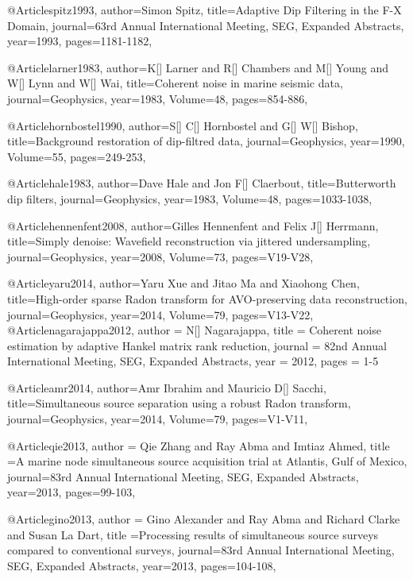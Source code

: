 {@Article{spitz1993,
  author={Simon Spitz},
  title={Adaptive Dip Filtering in the F-X Domain},
  journal={63rd Annual International Meeting, SEG, Expanded Abstracts},
  year=1993,
  pages={1181-1182},
}


@Article{larner1983,
  author={K[] Larner and R[] Chambers and M[] Young and W[] Lynn and W[] Wai},
  title={Coherent noise in marine seismic data},
  journal={Geophysics},
  year=1983,
  Volume=48,
  pages={854-886},
}

@Article{hornbostel1990,
  author={S[] C[] Hornbostel and G[] W[] Bishop},
  title={Background restoration of dip-filtred data},
  journal={Geophysics},
  year=1990,
  Volume=55,
  pages={249-253},
}

@Article{hale1983,
  author={Dave Hale and Jon F[] Claerbout},
  title={Butterworth dip filters},
  journal={Geophysics},
  year=1983,
  Volume=48,
  pages={1033-1038},
}

@Article{hennenfent2008,
  author={Gilles Hennenfent and Felix J[] Herrmann},
  title={Simply denoise: Wavefield reconstruction via jittered undersampling},
  journal={Geophysics},
  year=2008,
  Volume=73,
  pages={V19-V28},
}

@Article{yaru2014,
  author={Yaru Xue and Jitao Ma and Xiaohong Chen},
  title={High-order sparse Radon transform for AVO-preserving data reconstruction},
  journal={Geophysics},
  year=2014,
  Volume=79,
  pages={V13-V22},
}
@Article{nagarajappa2012,
  author = 	 {N[] Nagarajappa},
  title = 	 {Coherent noise estimation by adaptive Hankel matrix rank reduction},
  journal = 	 {82nd Annual International Meeting, SEG, Expanded Abstracts},
  year = 	 2012,
  pages =	 {1-5}
}

@Article{amr2014,
  author={Amr Ibrahim and Mauricio D[] Sacchi},
  title={Simultaneous source separation using a robust Radon transform},
  journal={Geophysics},
  year=2014,
  Volume=79,
  pages={V1-V11},
}

@Article{qie2013,
  author = {Qie Zhang and Ray Abma and Imtiaz Ahmed},
  title ={A marine node simultaneous source acquisition trial at Atlantis, Gulf of Mexico},
  journal={83rd Annual International Meeting, SEG, Expanded Abstracts},
  year=2013,
  pages={99-103},
}

@Article{gino2013,
  author = {Gino Alexander and Ray Abma and Richard Clarke and Susan La Dart},
  title ={Processing results of simultaneous source surveys compared to conventional surveys},
  journal={83rd Annual International Meeting, SEG, Expanded Abstracts},
  year=2013,
  pages={104-108},
}

}
